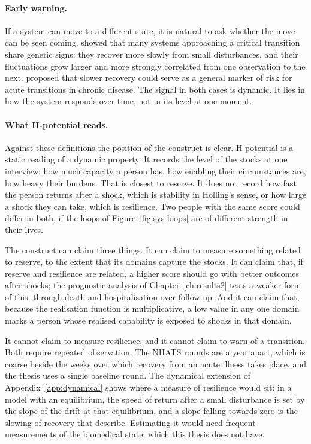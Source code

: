 \paragraph{Early warning.} If a system can move to a different state, it is
natural to ask whether the move can be seen coming. \citet{scheffer_2009}
showed that many systems approaching a critical transition share generic
signs: they recover more slowly from small disturbances, and their
fluctuations grow larger and more strongly correlated from one observation to
the next. \citet{olde_rikkert_2016} proposed that slower recovery could serve
as a general marker of risk for acute transitions in chronic disease. The
signal in both cases is dynamic. It lies in how the system responds over time,
not in its level at one moment.

\paragraph{What H-potential reads.} Against these definitions the position of
the construct is clear. H-potential is a static reading of a dynamic property.
It records the level of the stocks at one interview: how much capacity a
person has, how enabling their circumstances are, how heavy their burdens.
That is closest to reserve. It does not record how fast the person returns
after a shock, which is stability in Holling's sense, or how large a shock
they can take, which is resilience. Two people with the same score could
differ in both, if the loops of Figure~\ref{fig:sys-loops} are of different
strength in their lives.

The construct can claim three things. It can claim to measure something
related to reserve, to the extent that its domains capture the stocks. It can
claim that, if reserve and resilience are related, a higher score should go
with better outcomes after shocks; the prognostic analysis of
Chapter~\ref{ch:results2} tests a weaker form of this, through death and
hospitalisation over follow-up. And it can claim that, because the
realisation function is multiplicative, a low value in any one domain marks a
person whose realised capability is exposed to shocks in that domain.

It cannot claim to measure resilience, and it cannot claim to warn of a
transition. Both require repeated observation. The NHATS rounds are a year
apart, which is coarse beside the weeks over which recovery from an acute
illness takes place, and the thesis uses a single baseline round. The
dynamical extension of Appendix~\ref{app:dynamical} shows where a measure of
resilience would sit: in a model with an equilibrium, the speed of return
after a small disturbance is set by the slope of the drift at that
equilibrium, and a slope falling towards zero is the slowing of recovery that
\citet{scheffer_2009} describe. Estimating it would need frequent
measurements of the biomedical state, which this thesis does not have.

